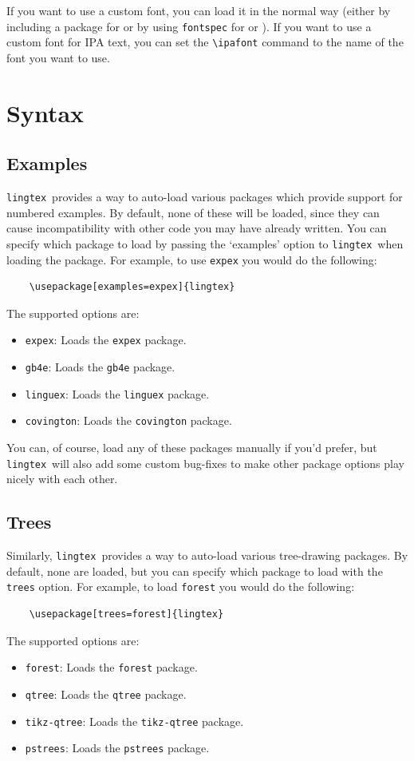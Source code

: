 \documentclass{article}
\def\lingtex{\texttt{lingtex}}
\begin{document}
If you want to use a custom font, you can load it in the normal way (either by including a package for  or by using \verb|fontspec| for  or ). If you want to use a custom font for IPA text, you can set the \verb|\ipafont| command to the name of the font you want to use.

\section{Syntax} \label{sec:syntax}

\subsection{Examples} \label{ssec:examples}

\lingtex\ provides a way to auto-load various packages which provide support for numbered examples. By default, none of these will be loaded, since they can cause incompatibility with other code you may have already written. You can specify which package to load by passing the `examples' option to \lingtex\ when loading the package. For example, to use \texttt{expex} you would do the following:
\begin{verbatim}
    \usepackage[examples=expex]{lingtex}
\end{verbatim}
The supported options are:
\begin{itemize}
    \item \verb|expex|: Loads the \texttt{expex} package.
    \item \verb|gb4e|: Loads the \texttt{gb4e} package.
    \item \verb|linguex|: Loads the \texttt{linguex} package.
    \item \verb|covington|: Loads the \texttt{covington} package.
\end{itemize}
You can, of course, load any of these packages manually if you'd prefer, but \lingtex\ will also add some custom bug-fixes to make other package options play nicely with each other.

\subsection{Trees} \label{ssec:trees}

Similarly, \lingtex\ provides a way to auto-load various tree-drawing packages. By default, none are loaded, but you can specify which package to load with the \verb|trees| option. For example, to load \texttt{forest} you would do the following:
\begin{verbatim}
    \usepackage[trees=forest]{lingtex}
\end{verbatim}
The supported options are:
\begin{itemize}
    \item \verb|forest|: Loads the \texttt{forest} package.
    \item \verb|qtree|: Loads the \texttt{qtree} package.
    \item \verb|tikz-qtree|: Loads the \texttt{tikz-qtree} package.
    \item \verb|pstrees|: Loads the \texttt{pstrees} package.
\end{itemize}
\end{document}
